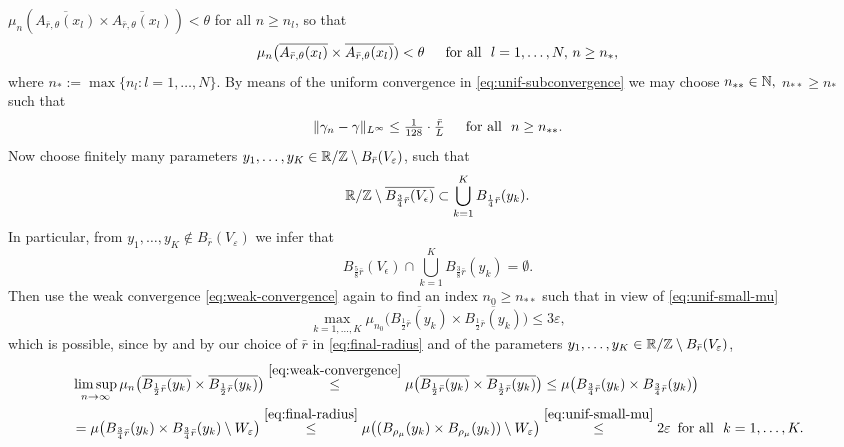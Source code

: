 $\mu_n(\overline{A_{\bar{r},\theta}(x_l)}\times
\overline{A_{\bar{r},\theta}(x_l)})<\theta$ for all $n\ge n_l$, so that
\begin{equation}\label{eq:unif-small-measures-annuli-indices}
\mu_n\big(\overline{A_{\bar{r},\theta}(x_l)}\times
\overline{A_{\bar{r},\theta}(x_l)})
<\theta\quad\,\,\,\text{for all }\,\, l=1,\ldots,N,\,n\ge n_*,
\end{equation}
where $n_*:=\max\{n_l:l=1,\ldots,N\}$.
By means of the uniform convergence in \eqref{eq:unif-subconvergence}
we may choose $n_{**}\in\mathbb{N},$ $n_{**}\ge n_*$ such that
\begin{equation}\label{eq:linfty-close-approx}
\|\gamma_n-\gamma\|_{L^\infty}\le\textstyle \frac1{128}\cdot\frac{\bar{r}}L
\quad\,\,\,\text{for all }\,\, n\ge n_{**}.
\end{equation}
Now choose finitely many parameters $y_1,\ldots,y_K\in \mathbb{R}/\mathbb{Z}\setminus
B_{\bar{r}}(V_\varepsilon)$, such that
\begin{equation}\label{eq:covering-complement-Veps}
\mathbb{R}/\mathbb{Z}\setminus \overline{B_{\frac34 \bar{r}}(V_\epsilon)}
\subset\bigcup_{k=1}^K B_{\frac14 \bar{r}}(y_k).
\end{equation}
In particular, from $y_1,\ldots,y_K\notin B_{\bar{r}}(V_\varepsilon)$ we infer that
\begin{equation}\label{eq:covering-intersect}
B_{\frac58 \bar{r}}(V_\epsilon)\cap\bigcup_{k=1}^K B_{\frac38 \bar{r}}(y_k)
=\emptyset.
\end{equation}
Then use the weak convergence \eqref{eq:weak-convergence} again to
find an index $n_0\ge n_{**}$ such that in view of \eqref{eq:unif-small-mu}
\begin{equation}\label{eq:max-mu-n0}
\max_{k=1,\ldots,K}\textstyle
\mu_{n_0}\big(\overline{B_{\frac12 \bar{r}}(y_k)}\times
\overline{B_{\frac12 \bar{r}}(y_k)}\big)\le 3\varepsilon,
\end{equation}
which is possible, since by \cite[Theorem~1.40]{evans-gariepy_2015} and
by our choice of $\bar{r}$ in \eqref{eq:final-radius} and of the
parameters $y_1,\ldots,y_K\in\mathbb{R}/\mathbb{Z}\setminus B_{\bar{r}}(V_\varepsilon)$,
\begin{align*}
&\limsup_{n\to\infty}\mu_n\big(\overline{B_{\frac12 \bar{r}}(y_k)}
\times
\overline{B_{\frac12 \bar{r}}(y_k)}\big)
\overset{\eqref{eq:weak-convergence}}{\le}
\mu\big(\overline{B_{\frac12 \bar{r}}(y_k)}
\times
\overline{B_{\frac12 \bar{r}}(y_k)}\big)\le
\mu\big(B_{\frac34 \bar{r}}(y_k)
\times B_{\frac34 \bar{r}}(y_k)\big)\\
& = \mu\big(B_{\frac34 \bar{r}}(y_k)
\times B_{\frac34 \bar{r}}(y_k)\setminus W_\varepsilon\big)
\overset{\eqref{eq:final-radius}}{\le}
\mu\big((B_{\rho_\mu}(y_k)
\times
B_{\rho_\mu}(y_k))\setminus W_\varepsilon\big)
\overset{\eqref{eq:unif-small-mu}}{\le}
2\varepsilon\,\,\,\text{for all }\,\, k=1,\ldots,K.
\end{align*}
